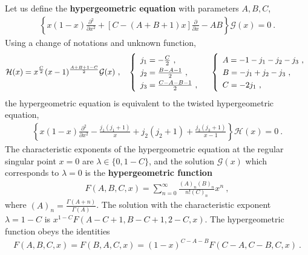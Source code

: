 \documentclass[12pt, a4paper, notitlepage, twoside]{report}
\numberwithin{equation}{section}
\theoremstyle{break}
\begin{document}
 Let us define the \textbf{\boldmath hypergeometric equation} with parameters $A,B,C$, 
\begin{align}
 \left\{ x(1-x) \frac{\partial^2}{\partial x^2} +\left[C-(A+B+1)x\right]{\frac{\partial}{\partial x}} - AB \right\} \mathcal{G}(x)= 0\ .
\label{dzp}
\end{align}
Using a change of notations and unknown function,
\begin{align}
 \mathcal{H}(x)= x^{\frac{C}{2}} (x-1)^{\frac{A+B+1-C}{2}}\mathcal{G}(x)\ , \quad \renewcommand{\arraystretch}{1.3}\left\{\begin{array}{l}  j_1 = -\frac{C}{2} \ , \\ j_2=\frac{B-A-1}{2} \ , \\  j_3= \frac{C-A-B-1}{2}\ , \end{array}\right.    
\quad \left\{\begin{array}{l}  A = -1-j_1-j_2-j_3\ , \\ B = -j_1+j_2-j_3\ , \\ C = -2j_1\ , \end{array}\right. 
\end{align}
the hypergeometric equation is equivalent to the twisted hypergeometric equation,
\begin{align}
 \left\{ x(1-x) \frac{\partial^2}{\partial x^2}  -\frac{j_1(j_1+1)}{x}+ j_2(j_2+1)+\frac{j_3(j_3+1)}{x-1}\right\} \mathcal{H}(x) = 0\ .
\label{hj}
\end{align}
The characteristic exponents of the hypergeometric equation at the regular singular point $x=0$ are $\lambda\in \{0,1-C\}$, and the solution $\mathcal{G}(x)$ which corresponds to $\lambda=0$
 is the \textbf{\boldmath hypergeometric function}
\begin{align}
 F(A,B,C,x) = \sum_{n=0}^\infty \frac{(A)_n(B)_n}{n!(C)_n}x^n\ ,
\label{fsn}
\end{align}
where $(A)_n = \frac{\Gamma(A+n)}{\Gamma(A)}$.
The solution with the characteristic exponent $\lambda=1-C$ is $x^{1-C}F(A-C+1,B-C+1,2-C,x)$.
The hypergeometric function obeys the identities 
\begin{align}
 F(A,B,C,x) = F(B,A,C,x) = (1-x)^{C-A-B} F(C-A,C-B,C,x)\ .
\label{fff}
\end{align}
\end{document}
